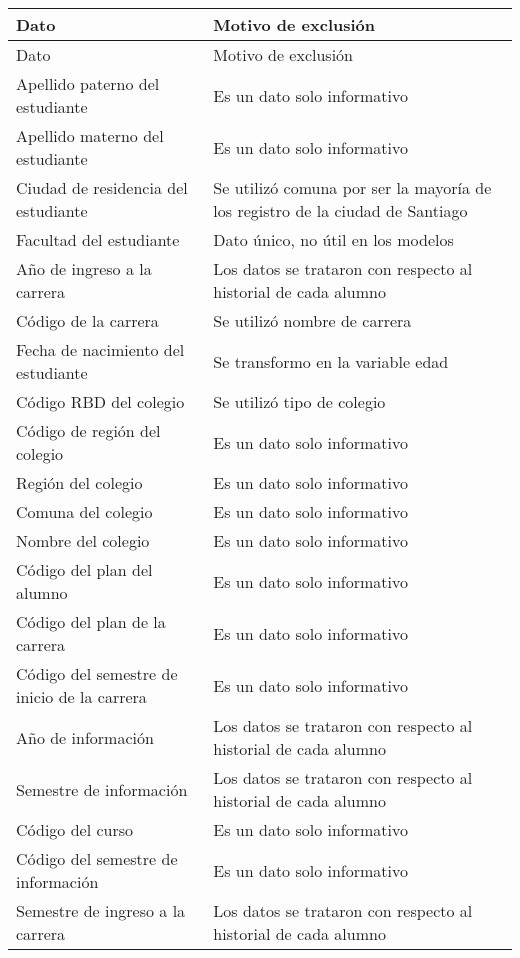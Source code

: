 \begin{longtable}{| p{5cm}| p{7cm} |}
	\hline
	Dato & Motivo de exclusión\\
	\hline \hline
	\endfirsthead
	
	\hline
	Dato & Motivo de exclusión\\
	\hline \hline
	\endhead
Apellido paterno del estudiante & Es un dato solo informativo	\\ \hline			
Apellido materno del estudiante & Es un dato solo informativo  \\ \hline
Ciudad de residencia del estudiante & Se utilizó comuna por ser la mayoría de los registro de la ciudad de Santiago\\ \hline
Facultad del estudiante & Dato único, no útil en los modelos\\ \hline
Año de ingreso a la carrera & Los datos se trataron con respecto al historial de cada alumno	\\ \hline
Código de la carrera & Se utilizó nombre de carrera	\\ \hline
Fecha de nacimiento del estudiante & Se transformo en la variable edad	\\ \hline
Código RBD del colegio & Se utilizó tipo de colegio \\ \hline
Código de región del colegio & Es un dato solo informativo	\\ \hline
Región del colegio & Es un dato solo informativo	\\ \hline
Comuna del colegio & Es un dato solo informativo	\\ \hline
Nombre del colegio & Es un dato solo informativo	\\ \hline
Código del plan del alumno & Es un dato solo informativo	\\ \hline
Código del plan de la carrera & Es un dato solo informativo	\\ \hline
Código del semestre de inicio de la carrera & Es un dato solo informativo	\\ \hline
Año de información & Los datos se trataron con respecto al historial de cada alumno	\\ \hline
Semestre de información & Los datos se trataron con respecto al historial de cada alumno	\\ \hline
Código del curso & Es un dato solo informativo	\\ \hline
Código del semestre de información & Es un dato solo informativo	\\ \hline
Semestre de ingreso a la carrera &  Los datos se trataron con respecto al historial de cada alumno	\\ \hline

\end{longtable}
